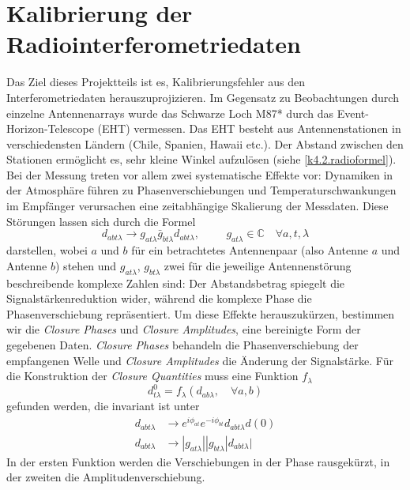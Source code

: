 \section{Kalibrierung der Radiointerferometriedaten}

Das Ziel dieses Projektteils ist es, Kalibrierungsfehler aus den Interferometriedaten herauszuprojizieren. Im Gegensatz zu Beobachtungen durch einzelne Antennenarrays wurde das Schwarze Loch M87* durch das Event-Horizon-Telescope (EHT) vermessen. Das EHT besteht aus Antennenstationen in verschiedensten Ländern (Chile, Spanien, Hawaii etc.). Der Abstand zwischen den Stationen ermöglicht es, sehr kleine Winkel aufzulösen (siehe \cref{k4.2.radioformel}).
Bei der Messung treten vor allem zwei systematische Effekte vor: Dynamiken in der Atmosphäre führen zu Phasenverschiebungen und Temperaturschwankungen im Empfänger verursachen eine zeitabhängige Skalierung der Messdaten. Diese Störungen lassen sich durch die Formel
\begin{equation}
d_{abt\lambda}\rightarrow g_{at\lambda} \bar{g}_{bt\lambda}d_{abt\lambda}, \hspace{1cm} g_{at \lambda} \in \mathbb{C} \quad \forall a,t,\lambda
\end{equation}
darstellen, wobei $a$ und $b$ für ein betrachtetes Antennenpaar (also Antenne $a$ und Antenne $b$) stehen und $g_{at\lambda}$,  $g_{bt\lambda}$ zwei für die jeweilige Antennenstörung beschreibende komplexe Zahlen sind: Der Abstandsbetrag spiegelt die Signalstärkenreduktion wider, während die komplexe Phase die Phasenverschiebung repräsentiert.
Um diese Effekte herauszukürzen, bestimmen wir die \emph{Closure Phases} und \emph{Closure Amplitudes}, eine bereinigte Form der gegebenen Daten. \emph{Closure Phases} behandeln die Phasenverschiebung der empfangenen Welle und \emph{Closure Amplitudes} die Änderung der Signalstärke. Für die Konstruktion der \emph{Closure Quantities} muss eine Funktion $f_\lambda$
\begin{equation}
d^0_{t\lambda}=f_{\lambda}(d_{ab\lambda},\quad \forall a,b)
\end{equation}
gefunden werden, die invariant ist unter
\begin{align}
d_{abt\lambda} &\rightarrow e^{i \phi_{at}} e^{-i\phi_{bt}} d_{abt\lambda}d(0)\\
d_{abt\lambda}&\rightarrow|g_{at\lambda}||g_{bt\lambda}|d_{abt\lambda}|
\end{align}
In der ersten Funktion werden die Verschiebungen in der Phase rausgekürzt, in der zweiten die Amplitudenverschiebung.
